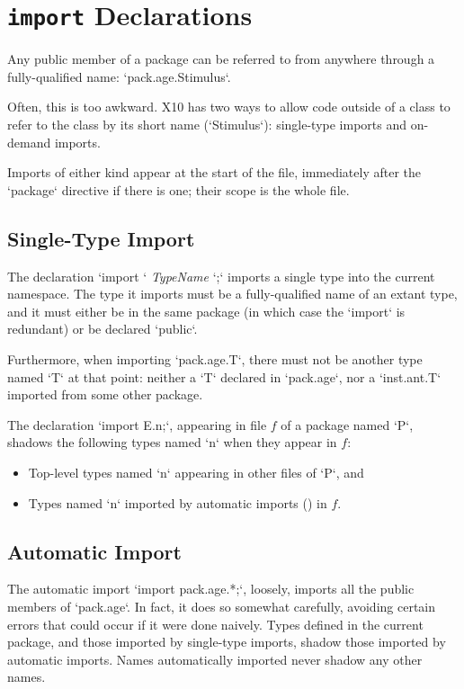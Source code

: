 \section{{\tt import} Declarations}
\label{sect:ImportDecl}

Any public member of a package can be referred to from anywhere through a
fully-qualified name: \xcd`pack.age.Stimulus`.    

Often, this is too awkward.  X10 has two ways to allow code outside of a class
to refer to the class by its short name (\xcd`Stimulus`): single-type imports
and on-demand imports.   

Imports of either kind appear at the start of the file, immediately after the
\xcd`package` directive if there is one; their scope is the whole file.

\subsection{Single-Type Import}

The declaration \xcd`import ` {\em TypeName} \xcd`;` imports a single type
into the current namespace.  The type it imports must be a fully-qualified
name of an extant type, and it must either be in the same package (in which
case the \xcd`import` is redundant) or be declared \xcd`public`.  

Furthermore, when importing \xcd`pack.age.T`, there must not be another type
named \xcd`T` at that point: neither a  \xcd`T` declared in \xcd`pack.age`,
nor a \xcd`inst.ant.T` imported from some other package.

The declaration \xcd`import E.n;`, appearing in file $f$ of a package named
\xcd`P`, shadows the following types named \xcd`n` when they appear in $f$: 
\begin{itemize}
\item Top-level types named \xcd`n` appearing in other files of \xcd`P`, and 
\item Types named \xcd`n` imported by automatic imports
      () in $f$.
\end{itemize}
\noindent


\subsection{Automatic Import}
\label{sect:AutomaticImport}

The automatic import \xcd`import pack.age.*;`, loosely, imports all the public
members of \xcd`pack.age`.  In fact, it does so somewhat carefully, avoiding
certain errors that could occur if it were done naively.  Types defined in the
current package, and those imported by single-type imports, shadow those
imported by automatic imports.   Names automatically imported never shadow any
other names.



